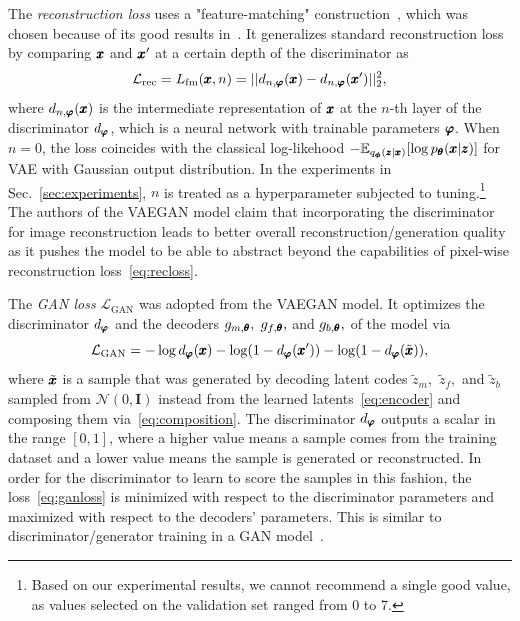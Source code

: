 The \emph{reconstruction loss} uses a "feature-matching" construction~\cite{salimans2016fmgan}, which was chosen because of its good results in~\cite{vskvara2021comparison}. It generalizes standard reconstruction loss by comparing $\pmb{{x}}$ and $\pmb{{x}}'$ at a certain depth of the discriminator  as
\begin{equation} \label{eq:recloss}
     \mathcal{L}_{\text{rec}} = L_{\text{fm}}(\pmb{{x}},n) =\vert \vert d_{n,\pmb{{\varphi}}}(\pmb{{x}}) - d_{n,\pmb{{\varphi}}}(\pmb{{x}}{'}) \vert \vert_2^2,
\end{equation} 
where $d_{n,\pmb{{\varphi}}}(\pmb{{x}})$ is the intermediate representation of $\pmb{{x}}$ at the $n$-th layer of the discriminator $d_{\pmb{{\varphi}}}$, which is a neural network with trainable parameters $\pmb{{\varphi}}$. When $n=0$, the loss coincides with the classical log-likehood $-\mathbb{E}_{q_{\pmb{{\phi}}}(\pmb{{z}} \vert \pmb{{x}})}[\log p_{\pmb{{\theta}}}(\pmb{{x}} \vert \pmb{{z}})]$ for VAE with Gaussian output distribution. In the experiments in Sec.~\ref{sec:experiments}, $n$ is treated as a hyperparameter subjected to tuning.\footnote{Based on our experimental results, we cannot recommend a single good value, as values selected on the validation set ranged from 0 to 7.} The authors of the VAEGAN model claim that incorporating the discriminator for image reconstruction leads to better overall reconstruction/generation quality as it pushes the model to be able to abstract beyond the capabilities of pixel-wise reconstruction loss~\eqref{eq:recloss}.

The \emph{GAN loss} $\mathcal{L}_{\text{GAN}}$ was adopted from the VAEGAN model. It optimizes the discriminator $d_{\pmb{{\varphi}}}$ and the decoders $g_{m,\pmb{{\theta}}},$ $g_{f,\pmb{{\theta}}},$ and $g_{b,\pmb{{\theta}}},$ of the model via
\begin{equation} \label{eq:ganloss}
    \mathcal{L}_{\text{GAN}} = - \log d_{\pmb{{\varphi}}}(\pmb{{x}}) - \log (1 - d_{\pmb{{\varphi}}}(\pmb{{x}}')) - \log (1-d_{\pmb{{\varphi}}}(\tilde{\pmb{{x}}})),
\end{equation}
where $\tilde{\pmb{{x}}}$ is a sample that was generated by decoding latent codes $\tilde{z}_m,$ $\tilde{z}_f,$ and $\tilde{z}_b$ sampled from $\mathcal{N}(0,\textbf{I})$ instead from the learned latents~\eqref{eq:encoder} and composing them via~\eqref{eq:composition}. The discriminator $d_{\pmb{{\varphi}}}$ outputs a scalar in the range $[0,1]$, where a higher value means a sample comes from the training dataset and a lower value means the sample is generated or reconstructed. In order for the discriminator to learn to score the samples in this fashion, the loss~\eqref{eq:ganloss} is minimized with respect to the discriminator parameters and maximized with respect to the decoders' parameters. This is similar to discriminator/generator training in a GAN model~\cite{goodfellow2014gan}.

